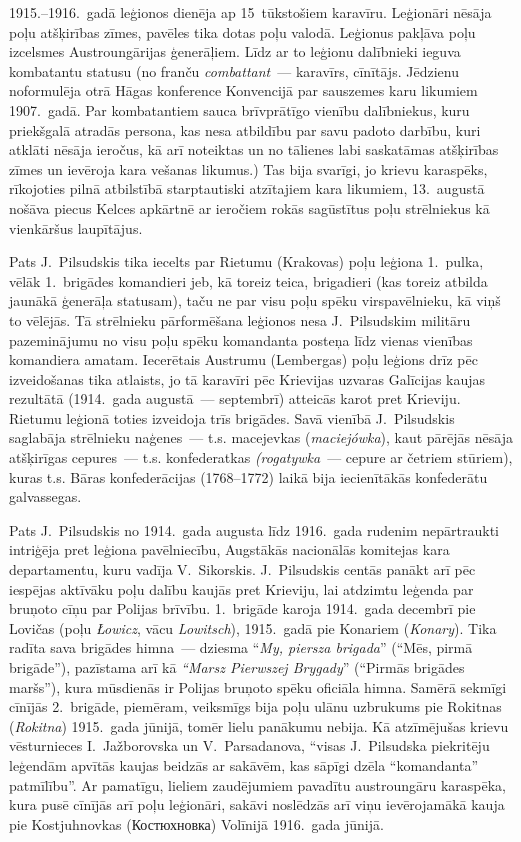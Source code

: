 \documentclass[twoside,a5paper,12pt,fleqn,openany]{extbook}
\newcommand{\pltxti}[1]{\textit{\textpolish{#1}}}
\newcommand{\rutxti}[1]{\textrussian{#1}}
\newcommand{\detxti}[1]{\textit{\textgerman{#1}}}
\newcommand{\frtxti}[1]{\textit{\textfrench{#1}}}
\begin{document}
1915.--1916.~gadā leģionos dienēja ap 15~tūkstošiem karavīru. Leģionāri nēsāja poļu atšķirības zīmes, pavēles tika dotas poļu valodā. Leģionus pakļāva poļu izcelsmes Austroungārijas ģenerāļiem. Līdz ar to leģionu dalībnieki ieguva kombatantu statusu (no franču \frtxti{combattant}~--- karavīrs, cīnītājs. Jēdzienu noformulēja otrā Hāgas konference Konvencijā par sauszemes karu likumiem 1907.~gadā. Par kombatantiem sauca brīvprātīgo vienību dalībniekus, kuru priekšgalā atradās persona, kas nesa atbildību par savu padoto darbību, kuri atklāti nēsāja ieročus, kā arī noteiktas un no tālienes labi saskatāmas atšķirības zīmes un ievēroja kara vešanas likumus.) Tas bija svarīgi, jo krievu karaspēks, rīkojoties pilnā atbilstībā starptautiski atzītajiem kara likumiem, 13.~augustā nošāva piecus Kelces apkārtnē ar ieročiem rokās sagūstītus poļu strēlniekus kā vienkāršus laupītājus.

Pats J.~Pilsudskis tika iecelts par Rietumu (Krakovas) poļu leģiona 1.~pulka, vēlāk 1.~brigādes komandieri jeb, kā toreiz teica, brigadieri (kas toreiz atbilda jaunākā ģenerāļa statusam), taču ne par visu poļu spēku virspavēlnieku, kā viņš to vēlējās. Tā strēlnieku pārformēšana leģionos nesa J.~Pilsudskim militāru pazeminājumu no visu poļu spēku komandanta posteņa līdz vienas vienības komandiera amatam. Iecerētais Austrumu (Lembergas) poļu leģions drīz pēc izveidošanas tika atlaists, jo tā karavīri pēc Krievijas uzvaras Galīcijas kaujas rezultātā (1914.~gada augustā~--- septembrī) atteicās karot pret Krieviju. Rietumu leģionā toties izveidoja trīs brigādes. Savā vienībā J.~Pilsudskis saglabāja strēlnieku naģenes~--- t.s. macejevkas (\pltxti{maciejówka}), kaut pārējās nēsāja atšķirīgas cepures~--- t.s. konfederatkas \pltxti{(rogatywka}~--- cepure ar četriem stūriem), kuras t.s. Bāras konfederācijas (1768--1772) laikā bija iecienītākās konfederātu galvassegas.

Pats J.~Pilsudskis no 1914.~gada augusta līdz 1916.~gada rudenim nepārtraukti intriģēja pret leģiona pavēlniecību, Augstākās nacionālās komitejas kara departamentu, kuru vadīja V.~Sikorskis. J.~Pilsudskis centās panākt arī pēc iespējas aktīvāku poļu dalību kaujās pret Krieviju, lai atdzimtu leģenda par bruņoto cīņu par Polijas brīvību. 1.~brigāde karoja 1914.~gada decembrī pie Lovičas (poļu \pltxti{Łowicz}, vācu \detxti{Lowitsch}), 1915.~gadā pie Konariem (\pltxti{Konary}). Tika radīta sava brigādes himna~--- dziesma ``\pltxti{My, piersza brigada}'' (``Mēs, pirmā brigāde''), pazīstama arī kā \pltxti{``Marsz Pierwszej Brygady}'' (``Pirmās brigādes maršs''), kura mūsdienās ir Polijas bruņoto spēku oficiāla himna. Samērā sekmīgi cīnījās 2.~brigāde, piemēram, veiksmīgs bija poļu ulānu uzbrukums pie Rokitnas (\pltxti{Rokitna}) 1915.~gada jūnijā, tomēr lielu panākumu nebija. Kā atzīmējušas krievu vēsturnieces I.~Jažborovska un V.~Parsadanova, ``visas J.~Pilsudska piekritēju leģendām apvītās kaujas beidzās ar sakāvēm, kas sāpīgi dzēla ``komandanta'' patmīlību''. Ar pamatīgu, lieliem zaudējumiem pavadītu austroungāru karaspēka, kura pusē cīnījās arī poļu leģionāri, sakāvi noslēdzās arī viņu ievērojamākā kauja pie Kostjuhnovkas (\rutxti{Костюхновка}) Volīnijā 1916.~gada jūnijā.
\end{document}
